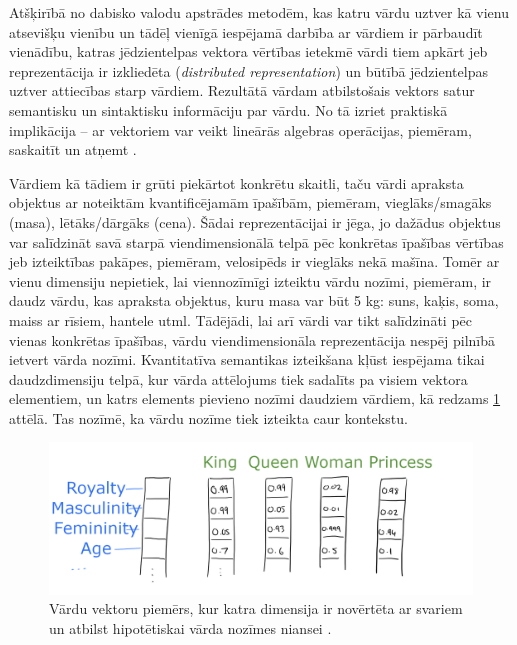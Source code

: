 Atšķirībā no dabisko valodu apstrādes metodēm, kas katru vārdu uztver kā vienu atsevišķu vienību un tādēļ vienīgā iespējamā darbība ar vārdiem ir pārbaudīt vienādību, katras jēdzientelpas vektora vērtības ietekmē vārdi tiem apkārt jeb reprezentācija ir izkliedēta (\textit{distributed representation}) un būtībā jēdzientelpas uztver attiecības starp vārdiem. Rezultātā vārdam atbilstošais vektors satur semantisku un sintaktisku informāciju par vārdu. No tā izriet praktiskā implikācija -- ar vektoriem var veikt lineārās algebras operācijas, piemēram, saskaitīt un atņemt \cite{colyer2016}.

Vārdiem kā tādiem ir grūti piekārtot konkrētu skaitli, taču vārdi apraksta objektus ar noteiktām kvantificējamām īpašībām, piemēram, vieglāks/smagāks (masa), lētāks/dārgāks (cena). Šādai reprezentācijai ir jēga, jo dažādus objektus var salīdzināt savā starpā viendimensionālā telpā pēc konkrētas īpašības vērtības jeb izteiktības pakāpes, piemēram, velosipēds ir vieglāks nekā mašīna. Tomēr ar vienu dimensiju nepietiek, lai viennozīmīgi izteiktu vārdu nozīmi, piemēram, ir daudz vārdu, kas apraksta objektus, kuru masa var būt 5 kg: suns, kaķis, soma, maiss ar rīsiem, hantele utml. Tādējādi, lai arī vārdi var tikt salīdzināti pēc vienas konkrētas īpašības, vārdu viendimensionāla reprezentācija nespēj pilnībā ietvert vārda nozīmi. Kvantitatīva semantikas izteikšana kļūst iespējama tikai daudzdimensiju telpā, kur vārda attēlojums tiek sadalīts pa visiem vektora elementiem, un katrs elements pievieno nozīmi daudziem vārdiem, kā redzams \ref{fig:distributed-representation} attēlā. Tas nozīmē, ka vārdu nozīme tiek izteikta caur kontekstu.


\begin{figure}[h]
	\centering
	\includegraphics[width=\textwidth]{figures/word2vec-distributed-representation.png}
	\caption{Vārdu vektoru piemērs, kur katra dimensija ir novērtēta ar svariem un atbilst hipotētiskai vārda nozīmes niansei \cite{colyer2016}.}
	\label{fig:distributed-representation}
\end{figure}

